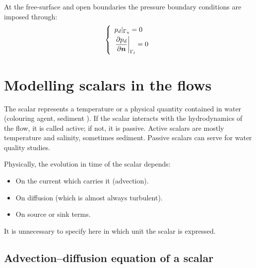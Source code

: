 At the free-surface and open boundaries the pressure boundary conditions are imposed through:
\begin{equation}\label{eq:free-surfaceBCs_p}
  \left\{
    \begin{array}{l}
      p_d|_{\Gamma_\eta} = 0 \smallskip \\
      \left.\dfrac{\partial p_d}{\partial \vec n}\right|_{\Gamma_l} = 0
    \end{array}
  \right.
\end{equation}

\section{Modelling scalars in the flows}

The scalar represents a temperature%
or a physical quantity contained in water (colouring agent, sediment%
%
). If the scalar interacts with the hydrodynamics of the flow, it is called
active; if not, it is passive. Active scalars are mostly temperature and
salinity, sometimes sediment. Passive scalars can serve for water quality studies.

Physically, the evolution in time of the scalar depends:

\begin{itemize}
\item On the current which carries it (advection).

\item On diffusion (which is almost always turbulent).

\item On source or sink terms.
\end{itemize}
It is unnecessary to specify here in which unit the scalar is expressed.

\subsection{\label{traceurs 3D transport}Advection--diffusion equation of a scalar}

